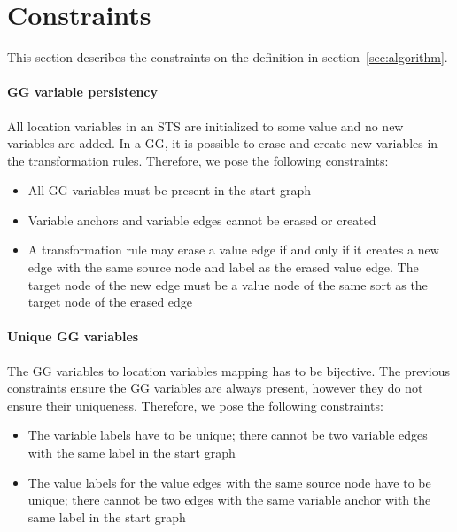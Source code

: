 \section{Constraints}\label{sec:constraints}

This section describes the constraints on the definition in section~\ref{sec:algorithm}.

\paragraph*{GG variable persistency} All location variables in an STS are initialized to some value and no new variables are added. In a GG, it is possible to erase and create new variables in the transformation rules. Therefore, we pose the following constraints:
\begin{itemize}
\item All GG variables must be present in the start graph
\item Variable anchors and variable edges cannot be erased or created
\item A transformation rule may erase a value edge if and only if it creates a new edge with the same source node and label as the erased value edge. The target node of the new edge must be a value node of the same sort as the target node of the erased edge
\end{itemize}

\paragraph*{Unique GG variables}
The GG variables to location variables mapping has to be bijective. The previous constraints ensure the GG variables are always present, however they do not ensure their uniqueness. Therefore, we pose the following constraints:
\begin{itemize}
\item The variable labels have to be unique; there cannot be two variable edges with the same label in the start graph
\item The value labels for the value edges with the same source node have to be unique; there cannot be two edges with the same variable anchor with the same label in the start graph
\end{itemize}

